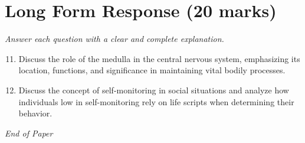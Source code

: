 \documentclass[12pt]{article}
\begin{document}
\section*{Long Form Response (20 marks)}
\textit{Answer each question with a clear and complete explanation.}
\begin{enumerate}[label=\arabic*.]
\setcounter{enumi}{10}
\item Discuss the role of the medulla in the central nervous system, emphasizing its location, functions, and significance in maintaining vital bodily processes.
\item Discuss the concept of self-monitoring in social situations and analyze how individuals low in self-monitoring rely on life scripts when determining their behavior.
\end{enumerate}

\vfill
\noindent\textit{End of Paper}
\end{document}
